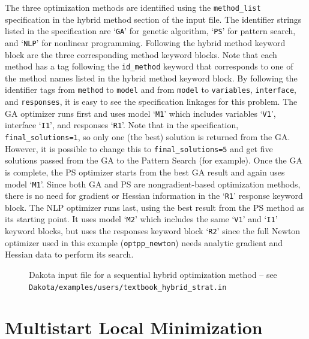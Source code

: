 The three optimization methods are identified using the
\texttt{method\_list} specification in the hybrid method section of the
input file. The identifier strings listed in the specification are
`\texttt{GA}' for genetic algorithm, `\texttt{PS}' for pattern search,
and `\texttt{NLP}' for nonlinear programming. Following the hybrid method
keyword block are the three corresponding method keyword blocks. Note
that each method has a tag following the \texttt{id\_method} keyword
that corresponds to one of the method names listed in the hybrid method
keyword block. By following the identifier tags from \texttt{method}
to \texttt{model} and from \texttt{model} to \texttt{variables},
\texttt{interface}, and \texttt{responses}, it is easy to see the
specification linkages for this problem. The GA optimizer runs first
and uses model `\texttt{M1}' which includes variables `\texttt{V1}',
interface `\texttt{I1}', and responses `\texttt{R1}'. 
Note that in the specification, \texttt{final\_solutions=1}, 
so only one (the best) solution is returned from the GA.  
However, it is possible to change this to \texttt{final\_solutions=5}
and get five solutions passed from the GA to the Pattern Search
(for example).  Once the GA is complete, the PS optimizer starts from the 
best GA result and again
uses model `\texttt{M1}'. Since both GA and PS are nongradient-based
optimization methods, there is no need for gradient or Hessian
information in the `\texttt{R1}' response keyword block. The NLP
optimizer runs last, using the best result from the PS method as its
starting point.  It uses model `\texttt{M2}' which includes the same
`\texttt{V1}' and `\texttt{I1}' keyword blocks, but uses the responses
keyword block `\texttt{R2}' since the full Newton optimizer used in
this example (\texttt{optpp\_newton}) needs analytic gradient and
Hessian data to perform its search.
\begin{figure}
  \centering
  \begin{bigbox}
    \begin{tiny}
    \end{tiny}
  \end{bigbox}
  \caption{Dakota input file for a sequential hybrid optimization method --
see \texttt{Dakota/examples/users/textbook\_hybrid\_strat.in} }
  \label{adv_meth:figure01}
\end{figure}

\section{Multistart Local Minimization}\label{adv_meth:multistart}

